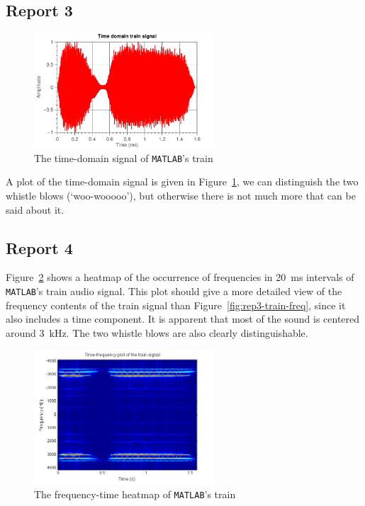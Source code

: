 \documentclass[11pt,titlepage]{report}
\begin{document}
\subsection{Report 3}

\begin{figure}[H]
	\centering
	\includegraphics[width=0.6\textwidth]{resource/ass-1-report-3.pdf}
	\caption{The time-domain signal of \texttt{MATLAB}'s train}
	\label{fig:rep3-train-time}
\end{figure}

A plot of the time-domain signal is given in Figure~\ref{fig:rep3-train-time}, we can distinguish the two whistle blows (`woo-wooooo'), but otherwise there is not much more that can be said about it.

\subsection{Report 4}
Figure~\ref{fig:rep4-train-heatmap} shows a heatmap of the occurrence of frequencies in \SI{20}{\milli\second} intervals of \texttt{MATLAB}'s train audio signal. This plot should give a more detailed view of the frequency contents of the train signal than Figure~\ref{fig:rep3-train-freq}, since it also includes a time component. It is apparent that most of the sound is centered around \SI{3}{\kilo\hertz}. The two whistle blows are also clearly distinguishable.

\begin{figure}[H]
	\centering
	\includegraphics[width=0.6\textwidth]{resource/ass-1-report-4.png}
	\caption{The frequency-time heatmap of \texttt{MATLAB}'s train}
	\label{fig:rep4-train-heatmap}
\end{figure}
\end{document}
